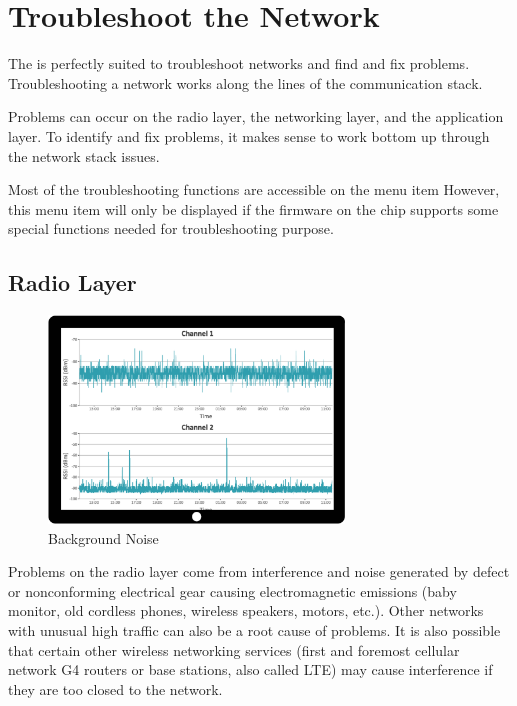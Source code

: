 \chapter{Troubleshoot the \zwave Network}
\label{c5:cit}

The \zweui is perfectly suited to troubleshoot networks and find and 
fix problems.  Troubleshooting a \zwave network works along the lines of the communication stack.

Problems can occur on the radio layer, the networking layer, and the application layer. To 
identify and fix problems, it makes sense to work bottom up through the network stack issues.

Most of the troubleshooting functions are accessible on the menu item  However, 
this menu item will only be displayed if the firmware on the \zwave chip supports some special 
functions needed for troubleshooting purpose.

\section{Radio Layer}

\begin{figure}
\begin{center}
\includegraphics[width=0.7\textwidth]{pngs/cap8/c2backgroundnoise.pdf}
\caption{Background Noise}
\label{c5:backgroundNoise}
\end{center}
\end{figure}

Problems on the radio layer come from interference and noise generated by defect or 
nonconforming electrical gear causing electromagnetic emissions (baby monitor, old cordless 
phones, wireless speakers, motors, etc.). Other \zwave networks with unusual high traffic 
can also be a root cause of problems. It is also possible that certain other wireless 
networking services (first and foremost cellular network G4 routers or base stations, also 
called LTE) may cause interference if they are too closed to the \zwave network.


